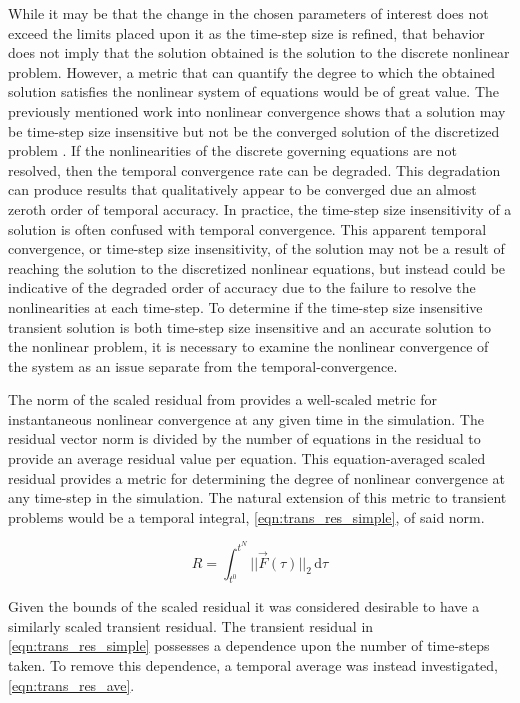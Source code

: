 While it may be that the change in the chosen parameters of interest does not exceed the limits placed upon it as the time-step size is refined, that behavior does not imply that the solution obtained is the solution to the discrete nonlinear problem.
However, a metric that can quantify the degree to which the obtained solution satisfies the nonlinear system of equations would be of great value.
The previously mentioned work into nonlinear convergence shows that a solution may be time-step size insensitive but not be the converged solution of the discretized problem \cite{Knoll2001}.
If the nonlinearities of the discrete governing equations are not resolved, then the temporal convergence rate can be degraded.
This degradation can produce results that qualitatively appear to be converged due an almost zeroth order of temporal accuracy.
In practice, the time-step size insensitivity of a solution is often confused with temporal convergence.
This apparent temporal convergence, or time-step size insensitivity, of the solution may not be a result of reaching the solution to the discretized nonlinear equations, but instead could be indicative of the degraded order of accuracy due to the failure to resolve the nonlinearities at each time-step.
To determine if the time-step size insensitive transient solution is both time-step size insensitive and an accurate solution to the nonlinear problem, it is necessary to examine the nonlinear convergence of the system as an issue separate from the temporal-convergence.

The norm of the scaled residual from  provides a well-scaled metric for instantaneous nonlinear convergence at any given time in the simulation.
The residual vector norm is divided by the number of equations in the residual to provide an average residual value per equation.
This equation-averaged scaled residual provides a metric for determining the degree of nonlinear convergence at any time-step in the simulation.
The natural extension of this metric to transient problems would be a temporal integral, \eqref{eqn:trans_res_simple}, of said norm.

\begin{equation}
\label{eqn:trans_res_simple}
R = \int_{t^{0}}^{t^{N}} ||\vec{F}(\tau)||_2 \,\mathrm{d} \tau
\end{equation}

Given the bounds of the scaled residual it was considered desirable to have a similarly scaled transient residual.
The transient residual in \eqref{eqn:trans_res_simple} possesses a dependence upon the number of time-steps taken.
To remove this dependence, a temporal average was instead investigated, \eqref{eqn:trans_res_ave}.


